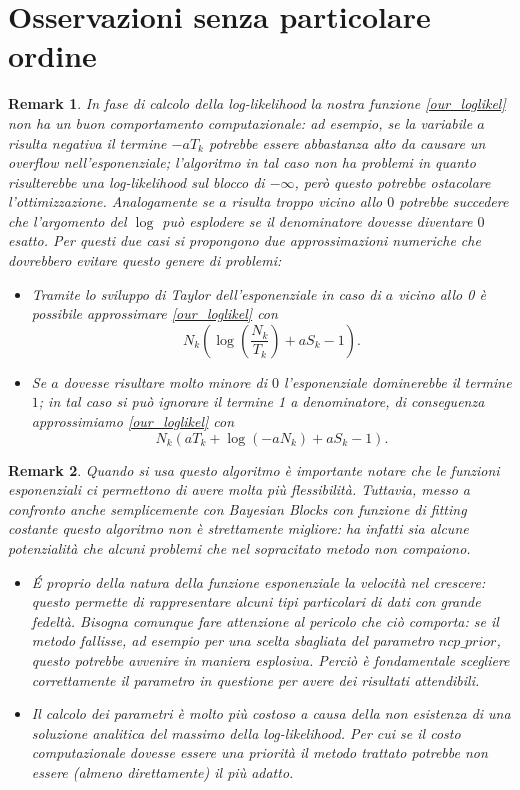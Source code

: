 \documentclass[10pt,a4paper]{report}
\newtheorem{remark}{Remark}
\begin{document}
\section{Osservazioni senza particolare ordine}
\begin{remark}
In fase di calcolo della log-likelihood la nostra funzione \eqref{our_loglikel} non ha un buon comportamento computazionale: ad esempio, se la variabile $a$ risulta negativa il termine $-aT_k$ potrebbe essere abbastanza alto da causare un overflow nell'esponenziale; l'algoritmo in tal caso non ha problemi in quanto risulterebbe una log-likelihood sul blocco di $-\infty$, però questo potrebbe ostacolare l'ottimizzazione. Analogamente se $a$ risulta troppo vicino allo $0$ potrebbe succedere che l'argomento del $\log$ può esplodere se il denominatore dovesse diventare $0$ esatto. Per questi due casi si propongono due approssimazioni numeriche che dovrebbero evitare questo genere di problemi:
\begin{itemize}
\item Tramite lo sviluppo di Taylor dell'esponenziale in caso di $a$ vicino allo 0 è possibile approssimare \eqref{our_loglikel} con
$$
N_k\left(\log\left(\frac{N_k}{T_k}\right)+aS_k-1\right).
$$
\item Se $a$ dovesse risultare molto minore di $0$ l'esponenziale dominerebbe il termine $1$; in tal caso si può ignorare il termine 1 a denominatore, di conseguenza approssimiamo \eqref{our_loglikel} con 
$$
N_k\left(aT_k+\log(-aN_k)+aS_k-1\right).
$$
\end{itemize}
\end{remark}
\begin{remark}
Quando si usa questo algoritmo è importante notare che le funzioni esponenziali ci permettono di avere molta più flessibilità. Tuttavia, messo a confronto anche semplicemente con Bayesian Blocks con funzione di fitting costante questo algoritmo non è strettamente migliore: ha infatti sia alcune potenzialità che alcuni problemi che nel sopracitato metodo non compaiono.
\begin{itemize}
\item \'E proprio della natura della funzione esponenziale la velocità nel crescere: questo permette di rappresentare alcuni tipi particolari di dati con grande fedeltà. Bisogna comunque fare attenzione al pericolo che ciò comporta: se il metodo fallisse, ad esempio per una scelta sbagliata del parametro $ncp\_prior$, questo potrebbe avvenire in maniera esplosiva. Perciò è fondamentale scegliere correttamente il parametro in questione per avere dei risultati attendibili.
\item Il calcolo dei parametri è molto più costoso a causa della non esistenza di una soluzione analitica del massimo della log-likelihood. Per cui se il costo computazionale dovesse essere una priorità il metodo trattato potrebbe non essere (almeno direttamente) il più adatto.
\end{itemize}
\end{remark}
\end{document}
